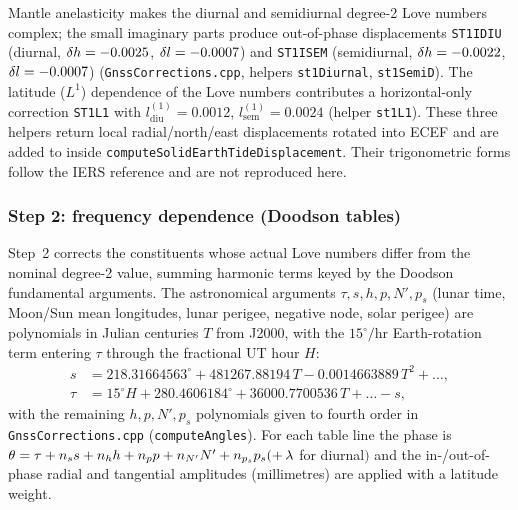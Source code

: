 \documentclass[main.tex]{subfiles}
\begin{document}
Mantle anelasticity makes the diurnal and semidiurnal degree-2 Love
numbers complex; the small imaginary parts produce out-of-phase
displacements \texttt{ST1IDIU} (diurnal, $\delta h=-0.0025$,
$\delta l=-0.0007$) and \texttt{ST1ISEM} (semidiurnal,
$\delta h=-0.0022$, $\delta l=-0.0007$)
(\texttt{GnssCorrections.cpp}, helpers \texttt{st1Diurnal}, \texttt{st1SemiD}).  The latitude ($L^1$)
dependence of the Love numbers contributes a horizontal-only correction
\texttt{ST1L1} with $l^{(1)}_{\mathrm{diu}}=0.0012$,
$l^{(1)}_{\mathrm{sem}}=0.0024$
(helper \texttt{st1L1}).  These three helpers
return local radial/north/east
displacements rotated into ECEF and are added to
 inside \texttt{computeSolidEarthTideDisplacement}.
Their trigonometric forms follow the IERS reference and are not
reproduced here.

\subsubsection{Step 2: frequency dependence (Doodson tables)}

Step~2 corrects the constituents whose actual Love numbers differ from
the nominal degree-2 value, summing harmonic terms keyed by the Doodson
fundamental arguments.  The astronomical arguments
$\tau,s,h,p,N',p_s$ (lunar time, Moon/Sun mean longitudes, lunar
perigee, negative node, solar perigee) are polynomials in Julian
centuries $T$ from J2000, with the $15^\circ/\mathrm{hr}$ Earth-rotation
term entering $\tau$ through the fractional UT hour $H$:
\begin{align}
s   &= 218.31664563^\circ + 481267.88194\,T - 0.0014663889\,T^2 + \ldots,
\label{eq:sitedisp-doodson-s}\\
\tau &= 15^\circ\! H + 280.4606184^\circ + 36000.7700536\,T + \ldots - s,
\label{eq:sitedisp-doodson-tau}
\end{align}
with the remaining $h,p,N',p_s$ polynomials given to fourth order in
\texttt{GnssCorrections.cpp} (\texttt{computeAngles}).  For
each table line the phase is
$\theta = \tau + n_s s + n_h h + n_p p + n_{N'}N' + n_{p_s}p_s
(+\,\lambda$ for diurnal$)$ and the in-/out-of-phase radial and
tangential amplitudes (millimetres) are applied with a latitude weight.
\end{document}
